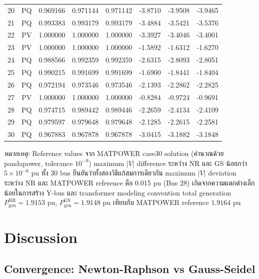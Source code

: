 \documentclass[12pt,a4paper]{article}
\begin{document}
\begin{table}[H]
\begin{tabular}{cccccccc}
20 & PQ    & 0.969166 & 0.971144 & 0.971142 & -3.8710 & -3.9508 & -3.9465 \\
21 & PQ    & 0.993383 & 0.993179 & 0.993179 & -3.4884 & -3.5421 & -3.5376 \\
22 & PV    & 1.000000 & 1.000000 & 1.000000 & -3.3927 & -3.4046 & -3.4001 \\
23 & PV    & 1.000000 & 1.000000 & 1.000000 & -1.5892 & -1.6312 & -1.6270 \\
24 & PQ    & 0.988566 & 0.992359 & 0.992359 & -2.6315 & -2.8093 & -2.8051 \\
25 & PQ    & 0.990215 & 0.991699 & 0.991699 & -1.6900 & -1.8441 & -1.8404 \\
26 & PQ    & 0.972194 & 0.973546 & 0.973546 & -2.1393 & -2.2862 & -2.2825 \\
27 & PV    & 1.000000 & 1.000000 & 1.000000 & -0.8284 & -0.9724 & -0.9691 \\
28 & PQ    & 0.974715 & 0.989442 & 0.989446 & -2.2659 & -2.4134 & -2.4109 \\
29 & PQ    & 0.979597 & 0.979648 & 0.979648 & -2.1285 & -2.2615 & -2.2581 \\
30 & PQ    & 0.967883 & 0.967878 & 0.967878 & -3.0415 & -3.1882 & -3.1848 \\
\bottomrule
\end{tabular}
\end{table}

\begin{flushleft}
\footnotesize
\textit{หมายเหตุ:} Reference values จาก MATPOWER case30 solution (คำนวณด้วย pandapower, tolerance $10^{-9}$) maximum $|V|$ difference ระหว่าง NR และ GS น้อยกว่า $5\times10^{-6}$ pu ทั้ง 30 bus ยืนยันว่าทั้งสองวิธีแก้สมการเดียวกัน maximum $|V|$ deviation ระหว่าง NR และ MATPOWER reference คือ 0.015 pu (Bus 28) เกิดจากความแตกต่างเล็กน้อยในการสร้าง Y-bus และ transformer modeling convention total generation $P_{\text{gen}}^{\text{NR}} = 1.9153$ pu, $P_{\text{gen}}^{\text{GS}} = 1.9148$ pu เทียบกับ MATPOWER reference $1.9164$ pu
\end{flushleft}

\section{Discussion}

\subsection{Convergence: Newton-Raphson vs Gauss-Seidel}
\end{document}
